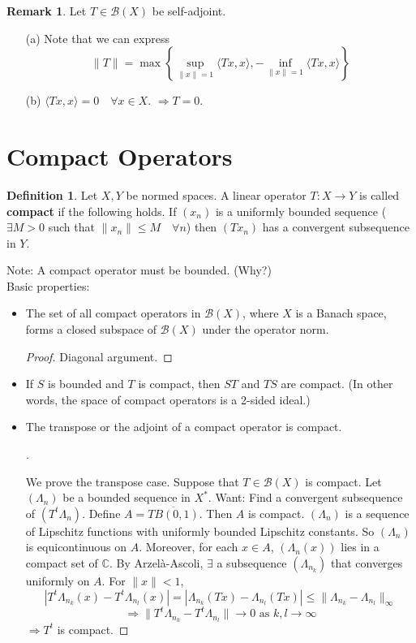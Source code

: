 \documentclass{article}
\theoremstyle{definition}
\newtheorem{dfn}{Definition}
\newtheorem{rem}{Remark}
\newenvironment{proofs}[1][\proofname]{%
  \begin{proof}[#1]$ $\par\nobreak\ignorespaces
}{%
  \end{proof}
}
\newcommand{\B}{\mathcal B}
\newcommand{\CC}{\mathbb C}
\begin{document}
\begin{rem}
	Let $T \in \B(X)$ be self-adjoint.
	\begin{enumerate}
		\item[(a)] Note that we can express
			\[
				\|T\| = \max \left\{ \sup_{\|x\| = 1} \langle T x, x \rangle, - \inf_{\|x\| = 1} \langle T x, x \rangle \right\}
			\]
			
		\item[(b)] $\langle T x, x \rangle = 0 \quad \forall x \in X$.
			$\Rightarrow T = 0$.

	\end{enumerate}
\end{rem}

\section{Compact Operators}

\begin{dfn}
	Let $X, Y$ be normed spaces.
	A linear operator $T: X \to Y$ is called \textbf{compact} if the following holds.
	If $(x_n)$ is a uniformly bounded sequence ($\exists M > 0$ such that $\|x_n\| \leq M \quad \forall n$) then $(T x_n)$ has a convergent subsequence in $Y$.
\end{dfn}

Note: A compact operator must be bounded. (Why?)\\
Basic properties:
\begin{itemize}
	\item The set of all compact operators in $\B(X)$, where $X$ is a Banach space, forms a closed subspace of $\B(X)$ under the operator norm.
		\begin{proof}
			Diagonal argument.
		\end{proof}

	\item If $S$ is bounded and $T$ is compact, then $ST$ and $TS$ are compact.
		(In other words, the space of compact operators is a 2-sided ideal.)

	\item The transpose or the adjoint of a compact operator is compact.
		\begin{proofs}
			We prove the transpose case.
			Suppose that $T \in \B(X)$ is compact.
			Let $(\Lambda_n)$ be a bounded sequence in $X^*$.
			Want: Find a convergent subsequence of $(T^t \Lambda_n)$.
			Define $A = \overline{T B(0, 1)}$.
			Then $A$ is compact.
			$(\Lambda_n)$ is a sequence of Lipschitz functions with uniformly bounded Lipschitz constants.
			So $(\Lambda_n)$ is equicontinuous on $A$.
			Moreover, for each $x \in A$, $(\Lambda_n(x))$ lies in a compact set of $\CC$.
			By Arzel\`a-Ascoli, $\exists$ a subsequence $(\Lambda_{n_k})$ that converges uniformly on $A$.
			For $\|x\| < 1$, 
			\[
				| T^t \Lambda_{n_k} (x) - T^t \Lambda_{n_l}(x)| = |\Lambda_{n_k} (T x) - \Lambda_{n_l} (T x)| \leq \|\Lambda_{n_k} - \Lambda_{n_l}\|_\infty
			\]
			\[
				\Rightarrow \|T^t \Lambda_{n_k} - T^t \Lambda_{n_l}\| \to 0 \text{ as }k, l \to \infty
			\]
			$\Rightarrow T^t$ is compact.
		\end{proofs}
\end{itemize}
\end{document}
